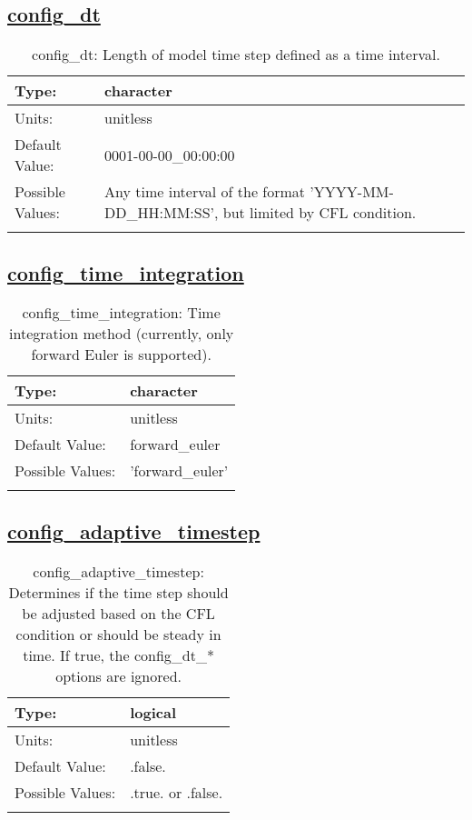 \subsection[config\_dt]{\hyperref[sec:nm_tab_time_integration]{config\_dt}}
\label{subsec:nm_sec_config_dt}
\begin{center}
\begin{longtable}{| p{2.0in} || p{4.0in} |}
    \hline
    Type: & character \\
    \hline
    Units: & \si{unitless} \\
    \hline
    Default Value: & 0001-00-00\_00:00:00 \\
    \hline
    Possible Values: & Any time interval of the format 'YYYY-MM-DD\_HH:MM:SS', but limited by CFL condition. \\
    \hline
    \caption{config\_dt: Length of model time step defined as a time interval.}
\end{longtable}
\end{center}
\subsection[config\_time\_integration]{\hyperref[sec:nm_tab_time_integration]{config\_time\_integration}}
\label{subsec:nm_sec_config_time_integration}
\begin{center}
\begin{longtable}{| p{2.0in} || p{4.0in} |}
    \hline
    Type: & character \\
    \hline
    Units: & \si{unitless} \\
    \hline
    Default Value: & forward\_euler \\
    \hline
    Possible Values: & 'forward\_euler' \\
    \hline
    \caption{config\_time\_integration: Time integration method (currently, only forward Euler is supported).}
\end{longtable}
\end{center}
\subsection[config\_adaptive\_timestep]{\hyperref[sec:nm_tab_time_integration]{config\_adaptive\_timestep}}
\label{subsec:nm_sec_config_adaptive_timestep}
\begin{center}
\begin{longtable}{| p{2.0in} || p{4.0in} |}
    \hline
    Type: & logical \\
    \hline
    Units: & \si{unitless} \\
    \hline
    Default Value: & .false. \\
    \hline
    Possible Values: & .true. or .false. \\
    \hline
    \caption{config\_adaptive\_timestep: Determines if the time step should be adjusted based on the CFL condition or should be steady in time. If true, the config\_dt\_* options are ignored.}
\end{longtable}
\end{center}
